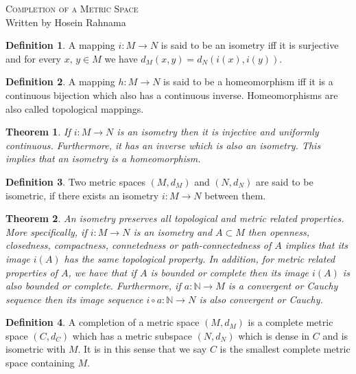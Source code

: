 \documentclass[10pt]{article}
\newtheorem{thm}{Theorem}
\theoremstyle{definition}
\newtheorem{defn}{Definition}
\theoremstyle{remark}
\begin{document}
\begin{center}
{\Large \scshape Completion of a Metric Space} \\
Written by Hosein Rahnama
\end{center}

\begin{defn}
A mapping $i:M\to N$ is said to be an isometry iff it is surjective and for every $x,\,y\in M$ we have $d_M(x,y)=d_N(i(x),i(y))$.
\end{defn}

\begin{defn}
A mapping $h:M\to N$ is said to be a homeomorphism iff it is a continuous bijection which also has a continuous inverse. Homeomorphisms are also called topological mappings.
\end{defn}

\begin{thm}
If $i:M\to N$ is an isometry then it is injective and uniformly continuous. Furthermore, it has an inverse which is also an isometry. This implies that an isometry is a homeomorphism.
\label{thm:iso}
\end{thm}

\begin{defn}
Two metric spaces $(M,d_M)$ and $(N,d_N)$ are said to be isometric, if there exists an isometry $i:M\to N$ between them.
\end{defn}

\begin{thm} 
An isometry preserves all topological and metric related properties. More specifically, if $i:M\to N$ is an isometry and $A\subset M$ then openness, closedness, compactness, connetedness or path-connectedness of $A$ implies that its image $i(A)$ has the same topological property. In addition, for metric related properties of $A$, we have that if $A$ is bounded or complete then its image $i(A)$ is also bounded or complete. Furthermore, if $a:\mathbb{N}\to M$ is a convergent or Cauchy sequence then its image sequence $i\circ a:\mathbb{N}\to N$ is also convergent or Cauchy.
\label{thm:iso:equi}
\end{thm}

\begin{defn}
A completion of a metric space $(M,d_M)$ is a complete metric space $(C,d_C)$ which has a metric subspace $(N,d_N)$ which is dense in $C$ and is isometric with $M$. It is in this sense that we say $C$ is the smallest complete metric space containing $M$.
\end{defn}
\end{document}
